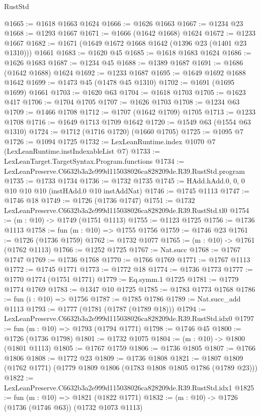 \begin{lexlean}{RustStd}
\begin{coremodule}
@1665 := @1618 @1663 @1624
@1666 := @1626 @1663
@1667 := @1234 @23
@1668 := @1293 @1667
@1671 := @1666 (@1642 @1668) @1624
@1672 := @1233 @1667
@1682 := @1671 (@1649 @1672 @1668 @1642 (@1396 @23 (@1401 @23 @1310))) @1661
@1683 := @1620 @45
@1685 := @1618 @1683 @1624
@1686 := @1626 @1683
@1687 := @1234 @45
@1688 := @1389 @1687
@1691 := @1686 (@1642 @1688) @1624
@1692 := @1233 @1687
@1695 := @1649 @1692 @1688 @1642
@1699 := @1473 @45 (@1478 @45 @1310)
@1702 := @1691 (@1695 @1699) @1661
@1703 := @1620 @63
@1704 := @1618 @1703
@1705 := @1623 @417
@1706 := @1704 @1705
@1707 := @1626 @1703
@1708 := @1234 @63
@1709 := @1466 @1708
@1712 := @1707 (@1642 @1709) @1705
@1713 := @1233 @1708
@1716 := @1649 @1713 @1709 @1642
@1720 := @1549 @63 (@1554 @63 @1310)
@1724 := @1712 (@1716 @1720) (@1660 @1705)
@1725 := @1095 @7
@1726 := @1094 @1725
@1732 := LexLeanRuntime.index @1070 @7 (LexLeanRuntime.instIndexableList @7)
@1733 := LexLeanTarget.TargetSyntax.Program.functions
@1734 := LexLeanPreserve.C6632b3a2e999d115038026ca828209de.R39.RustStd.program
@1735 := @1733 @1734
@1736 := @1732 @1735
@1745 := HAdd.hAdd.{0, 0, 0} @10 @10 @10 (instHAdd.{0} @10 instAddNat)
@1746 := @1745 @1113
@1747 := @1746 @18
@1749 := @1726 (@1736 @1747)
@1751 := @1732 LexLeanPreserve.C6632b3a2e999d115038026ca828209de.R39.RustStd.tl0
@1754 := (m : @10) -> @1749 (@1751 @1113)
@1755 := @1123 @1725
@1756 := @1736 @1113
@1758 := fun (m : @10) => @1755 @1756
@1759 := @1746 @23
@1761 := @1726 (@1736 @1759)
@1762 := @1732 @1077
@1765 := (m : @10) -> @1761 (@1762 @1113)
@1766 := @1252 @1725
@1767 := Nat.succ
@1768 := @1767 @1747
@1769 := @1736 @1768
@1770 := @1766 @1769
@1771 := @1767 @1113
@1772 := @1745 @1771
@1773 := @1772 @18
@1774 := @1736 @1773
@1777 := @1770 @1774 (@1751 @1771)
@1779 := Eq.symm.{1} @1725
@1781 := @1779 @1774 @1769
@1783 := @1347 @10 @1725
@1785 := @1783 @1773 @1768
@1786 := fun (i : @10) => @1756
@1787 := @1785 @1786
@1789 := Nat.succ_add @1113
@1793 := @1777 (@1781 (@1787 (@1789 @18)))
@1794 := LexLeanPreserve.C6632b3a2e999d115038026ca828209de.R39.RustStd.idx0
@1797 := fun (m : @10) => @1793 (@1794 @1771)
@1798 := @1746 @45
@1800 := @1726 (@1736 @1798)
@1801 := @1732 @1075
@1804 := (m : @10) -> @1800 (@1801 @1113)
@1805 := @1767 @1759
@1806 := @1736 @1805
@1807 := @1766 @1806
@1808 := @1772 @23
@1809 := @1736 @1808
@1821 := @1807 @1809 (@1762 @1771) (@1779 @1809 @1806 (@1783 @1808 @1805 @1786 (@1789 @23)))
@1822 := LexLeanPreserve.C6632b3a2e999d115038026ca828209de.R39.RustStd.idx1
@1825 := fun (m : @10) => @1821 (@1822 @1771)
@1832 := (m : @10) -> @1726 (@1736 (@1746 @63)) (@1732 @1073 @1113)

\end{coremodule}
\end{lexlean}
